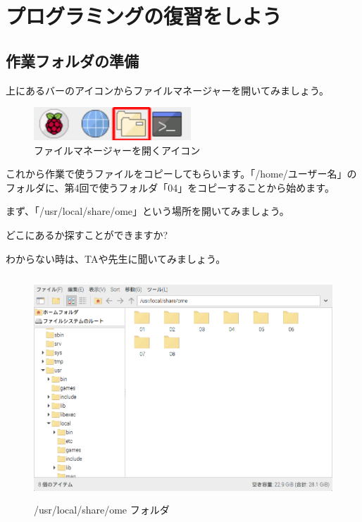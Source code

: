 \section{プログラミングの復習をしよう}

\subsection{作業フォルダの準備}
\bigskip
\bigskip

上にあるバーのアイコンからファイルマネージャーを開いてみましょう。


\begin{figure}[H]
  \begin{center}
    \includegraphics[keepaspectratio,width=5.898cm,height=1.242cm]{text04-img/text02-img001.png}
    \caption{ファイルマネージャーを開くアイコン}
  \end{center}
  \label{fig:prog_menu}
\end{figure}

これから作業で使うファイルをコピーしてもらいます。「/home/ユーザー名」のフォルダに、第4回で使うフォルダ「04」をコピーすることから始めます。

まず、「/usr/local/share/ome」という場所を開いてみましょう。

どこにあるか探すことができますか?

わからない時は、TAや先生に聞いてみましょう。


\begin{figure}[H]
  \begin{center}
    \includegraphics[keepaspectratio,width=11.232cm,height=8.424cm]{text04-img/s_ome04a.png}
    \caption{/usr/local/share/ome フォルダ}
  \end{center}
  \label{fig:prog_menu}
\end{figure}

